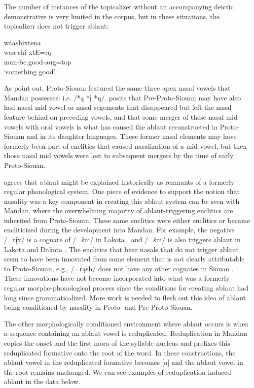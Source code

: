 The number of instances of the topicalizer without an accompanying deictic demonstrative is very limited in the corpus, but in these situations, the topicalizer does not trigger ablaut:

\begin{exe}
\item\label{somethingoodfootnote} \glll wáashixtena\\
	waa-shi-xtE=rą\\
	nom-\textnormal{be.good}-aug=top\\
\glt `something good' \citep[127]{trechter2012b}
\end{exe}

As \citet{rankinetalnd} point out, Proto-Siouan featured the same three apex nasal vowels that Mandan possesses: i.e. /*ą *į *ų/. \citet{rood1983} posits that Pre-Proto-Siouan may have also had nasal mid vowel or nasal segements that disappeared but left the nasal feature behind on preceding vowels, and that some merger of these nasal mid vowels with oral vowels is what has caused the ablaut reconstructed in Proto-Siouan and in its daughter languages. These former nasal elements may have formerly been part of enclitics that caused nasalization of a mid vowel, but then those nasal mid vowels were lost to subsequent mergers by the time of early Proto-Siouan.

\citet{jones1983b} agrees that ablaut might be explained historically as remnants of a formerly regular phonological system. One piece of evidence to support the notion that nasality was a key component in creating this ablaut system can be seen with Mandan, where the overwhelming majority of ablaut-triggering enclitics are inherited from Proto-Siouan. These same enclitics were either enclitics or became encliticized during the development into Mandan. For example, the negative /=rįx/ is a cognate of /=šni/ in Lakota \citep{rankin2015}, and /=šni/ is also triggers ablaut in Lakota and Dakota \citep[754]{ullrich2011}. The enclitics that bear nasals that do not trigger ablaut seem to have been innovated from some element that is not clearly attributable to Proto-Siouan, e.g., /=rąsh/ does not have any other cognates in Siouan \citep{rankin2010}. These innovations have not become incorporated into what was a formerly regular morpho-phonological process since the conditions for creating ablaut had long since grammaticalized. More work is needed to flesh out this idea of ablaut being conditioned by nasality in Proto- and Pre-Proto-Siouan.

The other morphologically conditioned environment where ablaut occurs is when a sequence containing an ablaut vowel is reduplicated. Reduplication in Mandan copies the onset and the first mora of the syllable nucleus and prefixes this reduplicated formative onto the root of the word. In these constructions, the ablaut vowel in the reduplicated formative becomes [a] and the ablaut vowel in the root remains unchanged. We can see examples of reduplication-induced ablaut in the data below.


